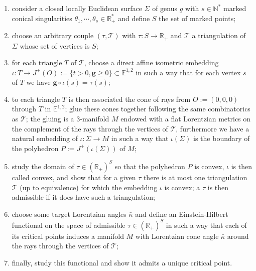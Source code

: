 \documentclass[a4paper,12pt]{article}
\def\NN{\mathbb N}
\def\TT{\mathcal T}
\def\RR{\mathbb{R}}
\newcommand{\mass}[1]{{\mathbb E}^{1,2}_{#1}}
\def\quadform{\mathbf{g}}
\theoremstyle{definition}
\begin{document}
					\begin{enumerate}
				\item consider a closed locally Euclidean surface $\Sigma$ of genus $g$ with $s\in \NN^*$ marked conical singularities $\theta_1,\cdots,\theta_s \in \RR_+^*$ and define $S$ the set of marked points;
				\item choose an arbitrary couple $(\tau,\TT)$ with $\tau: S \rightarrow \RR_+$ and $\TT$ a triangulation of $\Sigma$ whose set of vertices is $S$;
				
				\item for each triangle $T$ of $\TT$, choose a direct affine isometric embedding $\iota:T \rightarrow J^+(O):=\{t>0,\quadform\geq 0\}\subset \mass{}$ in such a way that for each vertex $s$ of $T$ we have $\quadform\circ \iota (s)=\tau(s)$; 
				\item to each triangle $T$ is then associated the cone of rays from $O:=(0,0,0)$ through $T$ in $\mass{}$; glue these cones together following the same combinatorics as $\TT$; the gluing is a 3-manifold $M$ endowed with a flat Lorentzian metrics on the complement of the rays through the vertices of $\TT$, furthermore we have a natural embedding of $\iota: \Sigma \rightarrow M$ in such a way that $\iota(\Sigma)$ is the boundary of the polyhedron $P:=J^+(\iota(\Sigma))$ of $M$;
				\item study the domain of $\tau \in (\RR_+)^{S}$ so that the polyhedron $P$ is convex, $\iota$ is then called convex, and show that for a given $\tau$ there is at most one triangulation $\TT$ (up to equivalence) for which the embedding $\iota$ is convex; a $\tau$ is then admissible if it does have such a triangulation;
				\item choose some target Lorentzian angles $\bar\kappa$ and	define an Einstein-Hilbert functional on the space of admissible $\tau \in (\RR_+)^{S}$ in such a way that each of its critical points induces a manifold $M$ with Lorentzian cone angle $\bar \kappa$ around the rays through the vertices of $\TT$; 	
				\item finally, study this functional and show it admits a unique critical point.
		 \end{enumerate}
		 
		
		
\end{document}
